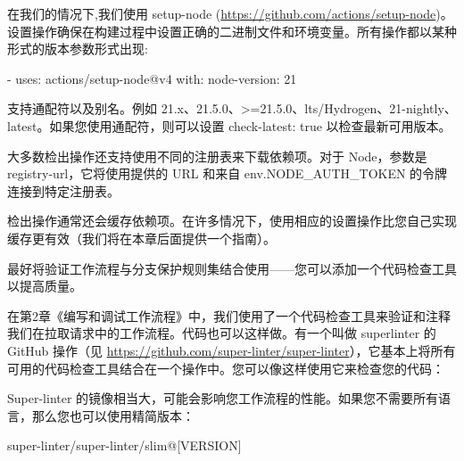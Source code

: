 在我们的情况下,我们使用 setup-node (\url{https://github.com/actions/setup-node})。设置操作确保在构建过程中设置正确的二进制文件和环境变量。所有操作都以某种形式的版本参数形式出现:

\begin{shell}
- uses: actions/setup-node@v4
  with:
    node-version: 21
\end{shell}

支持通配符以及别名。例如 21.x、21.5.0、>=21.5.0、lts/Hydrogen、21-nightly、latest。如果您使用通配符，则可以设置 check-latest: true 以检查最新可用版本。

大多数检出操作还支持使用不同的注册表来下载依赖项。对于 Node，参数是 registry-url，它将使用提供的 URL 和来自 env.NODE\_AUTH\_TOKEN 的令牌连接到特定注册表。

检出操作通常还会缓存依赖项。在许多情况下，使用相应的设置操作比您自己实现缓存更有效（我们将在本章后面提供一个指南）。


最好将验证工作流程与分支保护规则集结合使用——您可以添加一个代码检查工具以提高质量。


在第2章《编写和调试工作流程》中，我们使用了一个代码检查工具来验证和注释我们在拉取请求中的工作流程。代码也可以这样做。有一个叫做 superlinter 的 GitHub 操作（见 \url{https://github.com/super-linter/super-linter}），它基本上将所有可用的代码检查工具结合在一个操作中。您可以像这样使用它来检查您的代码：


Super-linter 的镜像相当大，可能会影响您工作流程的性能。如果您不需要所有语言，那么您也可以使用精简版本：

\begin{shell}
super-linter/super-linter/slim@[VERSION]
\end{shell}

